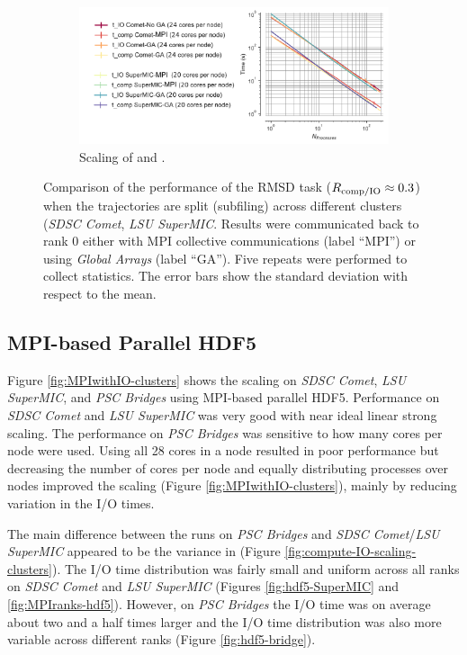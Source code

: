 \begin{figure}[!htb]
  \begin{subfigure}{0.7\textwidth}
    \includegraphics[width=\linewidth]{figures/Clusters_IO_compute_scaling_splitting_edited.pdf}
    \captionsetup{format=hang}
    \caption{Scaling of \tcomp and \tIO.}
    \label{fig:compute-IO-scaling-clusters-splitting}
  \end{subfigure}
  \caption{Comparison of the performance of the RMSD task ($R_{\text{comp/IO}} \approx 0.3$) when the trajectories are split (subfiling) across different clusters (\emph{SDSC Comet}, \emph{LSU SuperMIC}.
    Results were communicated back to rank 0 either with MPI collective communications (label ``MPI'') or using \emph{Global Arrays} (label ``GA'').
    Five repeats were performed to collect statistics.
    The error bars show the standard deviation with respect to the mean.}
\label{fig:MPI-splitting-clusters}
\end{figure} 

\subsection{MPI-based Parallel HDF5}

Figure \ref{fig:MPIwithIO-clusters} shows the scaling on \emph{SDSC Comet}, \emph{LSU SuperMIC}, and \emph{PSC Bridges} using MPI-based parallel HDF5.  
Performance on \emph{SDSC Comet} and \emph{LSU SuperMIC} was very good with near ideal linear strong scaling.
The performance on \emph{PSC Bridges} was sensitive to how many cores per node were used.
Using all 28 cores in a node resulted in poor performance but decreasing the number of cores per node and equally distributing processes over nodes improved the scaling (Figure \ref{fig:MPIwithIO-clusters}), mainly by reducing variation in the I/O times.

The main difference between the runs on \emph{PSC Bridges} and \emph{SDSC Comet}/\emph{LSU SuperMIC} appeared to be the variance in \tIO (Figure \ref{fig:compute-IO-scaling-clusters}).
The I/O time distribution was fairly small and uniform across all ranks on \emph{SDSC Comet} and \emph{LSU SuperMIC} (Figures \ref{fig:hdf5-SuperMIC} and \ref{fig:MPIranks-hdf5}).
However, on \emph{PSC Bridges} the I/O time was on average about two and a half times larger and the I/O time distribution was also more variable across different ranks (Figure \ref{fig:hdf5-bridge}).  

